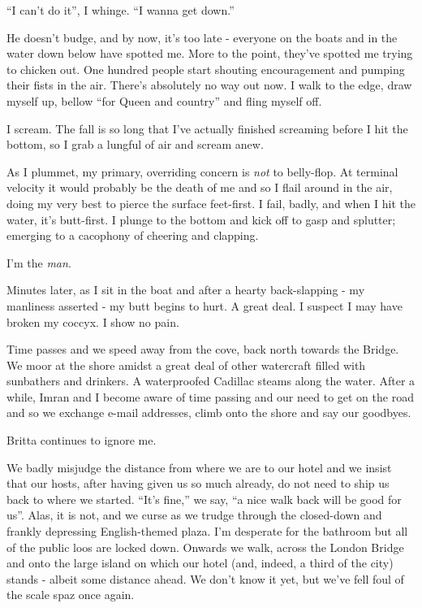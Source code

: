 \documentclass[a5paper,titlepage,11pt]{book}
\begin{document}
``I can't do it'', I whinge.  ``I wanna get down.''

He doesn't budge, and by now, it's too late - everyone on the boats and in the water down below have spotted me.  More to the point, they've spotted me trying to chicken out.  One hundred people start shouting encouragement and pumping their fists in the air.  There's absolutely no way out now.  I walk to the edge, draw myself up, bellow ``for Queen and country'' and fling myself off.

I scream.  The fall is so long that I've actually finished screaming before I hit the bottom, so I grab a lungful of air and scream anew.

As I plummet, my primary, overriding concern is \emph{not} to belly-flop.  At terminal velocity it would probably be the death of me and so I flail around in the air, doing my very best to pierce the surface feet-first.  I fail, badly, and when I hit the water, it's butt-first.  I  plunge to the bottom and kick off to gasp and splutter; emerging to a cacophony of cheering and clapping.

I'm the \emph{man}.

Minutes later, as I sit in the boat and after a hearty back-slapping - my manliness asserted - my butt begins to hurt.  A great deal.  I suspect I may have broken my coccyx.  I show no pain.

Time passes and we speed away from the cove, back north towards the Bridge.  We moor at the shore amidst a great deal of other watercraft filled with sunbathers and drinkers.  A waterproofed Cadillac steams along the water.  After a while, Imran and I become aware of time passing and our need to get on the road and so we exchange e-mail addresses, climb onto the shore and say our goodbyes.

Britta continues to ignore me.

We badly misjudge the distance from where we are to our hotel and we insist that our hosts, after having given us so much already, do not need to ship us back to where we started.  ``It's fine,'' we say, ``a nice walk back will be good for us''.  Alas, it is not, and we curse as we trudge through the closed-down and frankly depressing English-themed plaza.  I'm desperate for the bathroom but all of the public loos are locked down.  Onwards we walk, across the London Bridge and onto the large island on which our hotel (and, indeed, a third of the city) stands - albeit some distance ahead.  We don't know it yet, but we've fell foul of the scale spaz once again.
\end{document}
